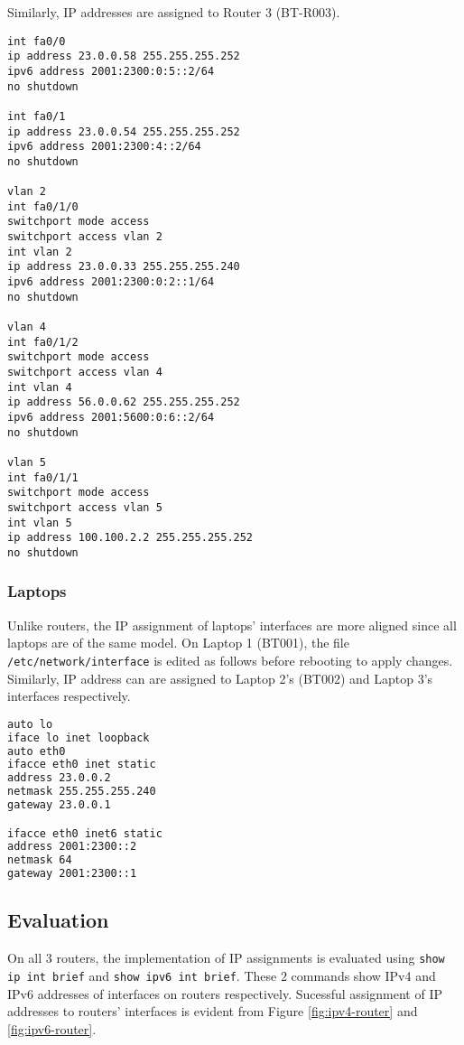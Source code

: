 Similarly, IP addresses are assigned to Router 3 (BT-R003).

\begin{lstlisting}
int fa0/0
ip address 23.0.0.58 255.255.255.252
ipv6 address 2001:2300:0:5::2/64
no shutdown

int fa0/1
ip address 23.0.0.54 255.255.255.252
ipv6 address 2001:2300:4::2/64
no shutdown

vlan 2
int fa0/1/0
switchport mode access
switchport access vlan 2
int vlan 2
ip address 23.0.0.33 255.255.255.240
ipv6 address 2001:2300:0:2::1/64
no shutdown

vlan 4
int fa0/1/2
switchport mode access
switchport access vlan 4
int vlan 4
ip address 56.0.0.62 255.255.255.252
ipv6 address 2001:5600:0:6::2/64
no shutdown

vlan 5
int fa0/1/1
switchport mode access
switchport access vlan 5
int vlan 5
ip address 100.100.2.2 255.255.255.252
no shutdown
\end{lstlisting}

\subsubsection{Laptops}

Unlike routers, the IP assignment of laptops' interfaces are more aligned since all laptops are of the same model. 
On Laptop 1 (BT001), the file \texttt{/etc/network/interface} is edited as follows before rebooting to apply changes. 
Similarly, IP address can are assigned to Laptop 2's (BT002) and Laptop 3's interfaces respectively.

\begin{lstlisting}[language=sh]
auto lo
iface lo inet loopback
auto eth0
ifacce eth0 inet static 
address 23.0.0.2
netmask 255.255.255.240
gateway 23.0.0.1

ifacce eth0 inet6 static 
address 2001:2300::2
netmask 64
gateway 2001:2300::1
\end{lstlisting}

\subsection{Evaluation}

On all $3$ routers, the implementation of IP assignments is evaluated using \texttt{show ip int brief} and \texttt{show ipv6 int brief}. These $2$ commands show IPv4 and IPv6 addresses of interfaces on routers respectively.
Sucessful assignment of IP addresses to routers' interfaces is evident from Figure \ref{fig:ipv4-router} and \ref{fig:ipv6-router}.

